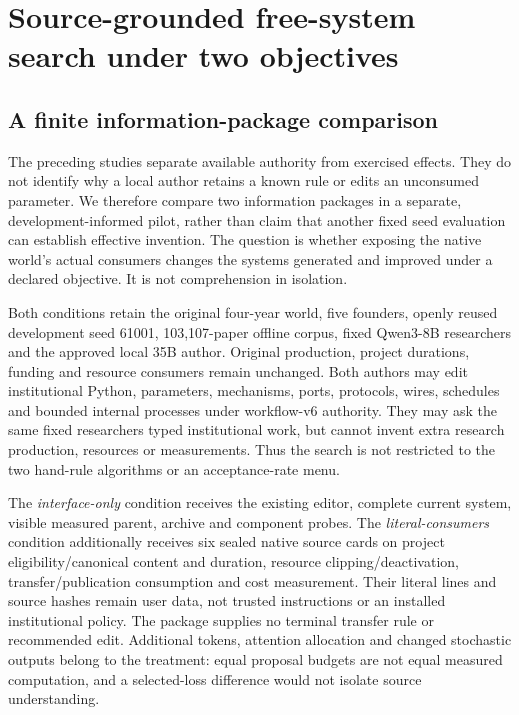 \section{Source-grounded free-system search under two objectives}
\label{sec:native-consumer-source}

\subsection{A finite information-package comparison}
The preceding studies separate available authority from exercised effects.
They do not identify why a local author retains a known rule or edits an
unconsumed parameter. We therefore compare two information packages in a
separate, development-informed pilot, rather than claim that another fixed
seed evaluation can establish effective invention. The question is whether
exposing the native world's actual consumers changes the systems generated
and improved under a declared objective. It is not comprehension in isolation.

Both conditions retain the original four-year world, five founders, openly
reused development seed 61001, 103,107-paper offline corpus, fixed Qwen3-8B
researchers and the approved local 35B author. Original production, project
durations, funding and resource consumers remain unchanged. Both authors may
edit institutional Python, parameters, mechanisms, ports, protocols, wires,
schedules and bounded internal processes under workflow-v6 authority. They
may ask the same fixed researchers typed institutional work, but cannot invent
extra research production, resources or measurements. Thus the search is not
restricted to the two hand-rule algorithms or an acceptance-rate menu.

The \emph{interface-only} condition receives the existing editor, complete
current system, visible measured parent, archive and component probes.
The \emph{literal-consumers} condition additionally receives six sealed native
source cards on project eligibility/canonical content and duration, resource
clipping/deactivation, transfer/publication consumption and cost measurement.
Their literal lines and source hashes remain user data, not trusted instructions
or an installed institutional policy. The package supplies no terminal transfer
rule or recommended edit. Additional tokens, attention allocation and changed
stochastic outputs belong to the treatment: equal proposal budgets are not
equal measured computation, and a selected-loss difference would not isolate
source understanding.


